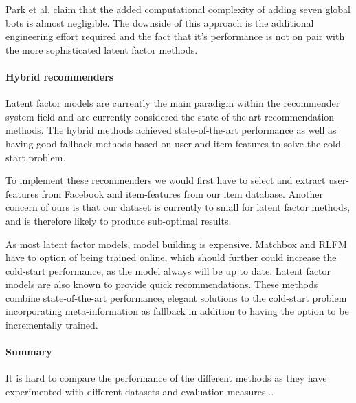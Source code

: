 Park et al. \cite{Park2006} claim that the added computational complexity of
adding seven global bots is almost negligible. The downside of this approach is
the additional engineering effort required and the fact that it's performance
is not on pair with the more sophisticated latent factor methods.

\paragraph{Hybrid recommenders}


Latent factor models are currently the main paradigm within the recommender
system field and are currently considered the state-of-the-art recommendation
methods. The hybrid methods achieved state-of-the-art performance as well as
having good fallback methods based on user and item features to solve the
cold-start problem.


To implement these recommenders we would first have to select and extract
user-features from Facebook and item-features from our item database. Another
concern of ours is that our dataset is currently to small for latent factor
methods, and is therefore likely to produce sub-optimal results.

As most latent factor models, model building is expensive. Matchbox and RLFM
have to option of being trained online, which should further could increase the
cold-start performance, as the model always will be up to date. Latent factor
models are also known to provide quick recommendations. These methods combine
state-of-the-art performance, elegant solutions to the cold-start problem
incorporating meta-information as fallback in addition to having the option to
be incrementally trained.

\paragraph{Summary}


It is hard to compare the performance of the different methods as they have
experimented with different datasets and evaluation measures...

